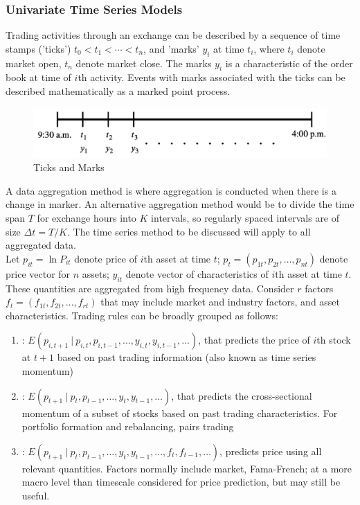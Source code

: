 \subsubsection{Univariate Time Series Models}

Trading activities through an exchange can be described by a sequence of time stamps ('ticks') $t_0 < t_1 < \cdots < t_n$, and 'marks' $y_i$ at time $t_i$, where $t_i$ denote market open, $t_n$ denote market close. The marks $y_i$ is a characteristic of the order book at time of $i$th activity. Events with marks associated with the ticks can be described mathematically as a marked point process.
\begin{figure}[H]
\centering
\includegraphics[scale=0.4]{images/math/tsa/ticksandmarks}
\caption{Ticks and Marks}
\end{figure}

A data aggregation method is where aggregation is conducted when there is a change in marker. An alternative aggregation method would be to divide the time span $T$ for exchange hours into $K$ intervals, so regularly spaced intervals are of size $\Delta t = T/K$. The time series method to be discussed will apply to all aggregated data.\\

Let $p_{it} = \ln P_{it}$ denote price of $i$th asset at time $t$; $p_t = (p_{1t}, p_{2t}, \ldots, p_{nt})$ denote price vector for $n$ assets; $y_{it}$ denote vector of characteristics of $i$th asset at time $t$. These quantities are aggregated from high frequency data. Consider $r$ factors $f_t = (f_{1t}, f_{2t}, \ldots, f_{rt})$ that may include market and industry factors, and asset characteristics. Trading rules can be broadly grouped as follows:
\begin{enumerate}[label=\roman*.]
\setlength{\itemsep}{0pt}
\item {}: $E(p_{i, t+1} \ \vert \ p_{i,t}, p_{i, t-1}, \ldots, y_{i,t}, y_{i, t-1}, \ldots)$, that predicts the price of $i$th stock at $t+1$ based on past trading information (also known as time series momentum)
\item {}: $E(p_{t+1} \ \vert \ p_t, p_{t-1}, \ldots, y_t, y_{t-1}, \ldots)$, that predicts the cross-sectional momentum of a subset of stocks based on past trading characteristics. For portfolio formation and rebalancing, pairs trading
\item {}: $E(p_{t+1} \ \vert \ p_{t}, p_{t-1}, \ldots, y_t, y_{t-1}, \ldots, f_t, f_{t-1}, \ldots)$, predicts price using all relevant quantities. Factors normally include market, Fama-French; at a more macro level than timescale considered for price prediction, but may still be useful.
\end{enumerate}

